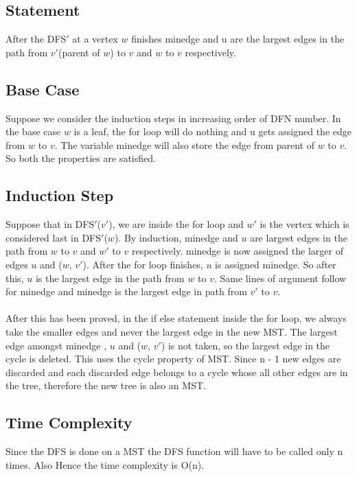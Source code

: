 \documentclass[a4paper,10pt]{article}
\begin{document}
\subsection{Statement}
After the DFS$'$ at a vertex $w$ finishes minedge and u are the largest edges in the path from $v'$(parent of $w$) to $v$ and $w$ to $v$
respectively.
\subsection{Base Case}
Suppose we consider the induction steps in increasing order of DFN number.
In the base case $w$ is a leaf, the for loop will do nothing and u gets assigned the edge from $w$ to $v$.
The variable minedge will also store the edge from parent of $w$ to $v$. So both the properties are satisfied.
\subsection{Induction Step}
Suppose that in DFS$'$($v'$), we are inside the for loop and $w'$ is the vertex which is considered last in
DFS$'$($w$). By induction, minedge and $u$ are largest edges in the path from $w$ to $v$ and $w'$ to $v$ respectively.
minedge is now assigned the larger of edges $u$ and ($w$, $v'$). After the for loop finishes, 
$u$ is assigned minedge. So after this, $u$ is the largest edge in the path from $w$ to $v$. Same lines of argument
follow for minedge and minedge is the largest edge in path from $v'$ to $v$.\\
\\
After this has been proved, in the if else statement inside the for loop, we always take the smaller edges and 
never the largest edge in the new MST. The largest edge amongst minedge , $u$ and ($w$, $v'$) is not taken, so
the largest edge in the cycle is deleted. This uses the cycle property of MST. Since n - 1 new edges are discarded
and each discarded edge belongs to a cycle whose all other edges are in the tree, therefore the new tree is also an MST.
\subsection{Time Complexity}
Since the DFS is done on a MST the DFS function will have to be called only n times. Also Hence the time complexity
is O(n).
\end{document}
